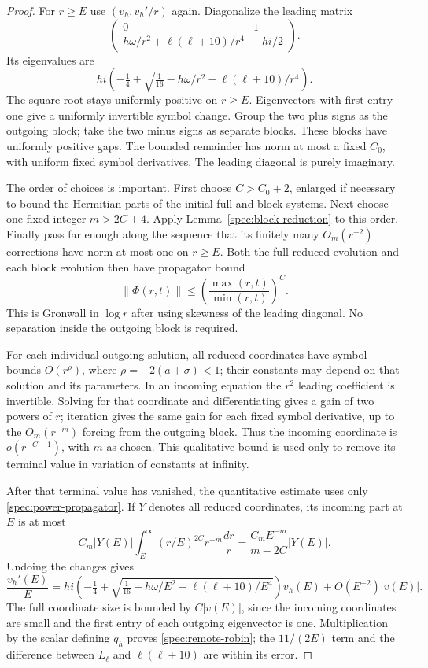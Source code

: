\begin{proof}
For $r\ge E$ use $(v_h,v_h'/r)$ again. Diagonalize the leading matrix
\[
 \begin{pmatrix}
 0&1\\ h\omega/r^2+\ell(\ell+10)/r^4&-hi/2
 \end{pmatrix}.
\]
Its eigenvalues are
\[
 hi\left(-\tfrac14\pm
 \sqrt{\tfrac1{16}-h\omega/r^2-\ell(\ell+10)/r^4}\right).
\]
The square root stays uniformly positive on $r\ge E$. Eigenvectors
with first entry one give a uniformly invertible symbol change.
Group the two plus signs as the outgoing block; take the two minus
signs as separate blocks. These blocks have uniformly positive gaps.
The bounded remainder has norm at most a fixed $C_0$, with uniform
fixed symbol derivatives. The leading diagonal is purely imaginary.

The order of choices is important. First choose $C>C_0+2$, enlarged
if necessary to bound the Hermitian parts of the initial full and
block systems. Next choose one fixed integer $m>2C+4$. Apply
Lemma~\ref{spec:block-reduction} to this order. Finally pass far enough
along the sequence that its finitely many $O_m(r^{-2})$ corrections
have norm at most one on $r\ge E$. Both the full reduced evolution
and each block evolution then have propagator bound
\begin{equation}\label{spec:power-propagator}
 \|\Phi(r,t)\|\le
 \left(\frac{\max(r,t)}{\min(r,t)}\right)^C.
\end{equation}
This is Gronwall in $\log r$ after using skewness of the leading
diagonal. No separation inside the outgoing block is required.

For each individual outgoing solution, all reduced coordinates have
symbol bounds $O(r^\rho)$, where $\rho=-2(a+\sigma)<1$; their constants
may depend on that solution and its parameters. In an incoming
equation the $r^2$ leading coefficient is invertible. Solving for that
coordinate and differentiating gives a gain of two powers of $r$;
iteration gives the same gain for each fixed symbol derivative, up
to the $O_m(r^{-m})$ forcing from the outgoing block. Thus the incoming
coordinate is $o(r^{-C-1})$, with $m$ as chosen. This qualitative
bound is used only to remove its terminal value in variation of
constants at infinity.

After that terminal value has vanished, the quantitative estimate
uses only \eqref{spec:power-propagator}. If $Y$ denotes all reduced
coordinates, its incoming part at $E$ is at most
\[
 C_m|Y(E)|\int_E^\infty(r/E)^{2C}r^{-m}\frac{dr}{r}
 =\frac{C_mE^{-m}}{m-2C}|Y(E)|.
\]
Undoing the changes gives
\[
 \frac{v_h'(E)}E=
 hi\left(-\tfrac14+
 \sqrt{\tfrac1{16}-h\omega/E^2-\ell(\ell+10)/E^4}\right)v_h(E)
 +O(E^{-2})|v(E)|.
\]
The full coordinate size is bounded by $C|v(E)|$, since the incoming
coordinates are small and the first entry of each outgoing
eigenvector is one. Multiplication by the scalar defining $q_h$
proves \eqref{spec:remote-robin}; the $11/(2E)$ term and the difference
between $L_\ell$ and $\ell(\ell+10)$ are within its error.
\end{proof}


